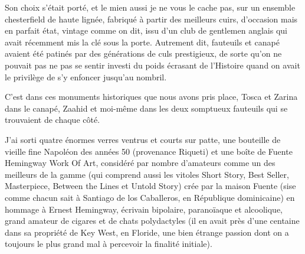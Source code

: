 Son choix s’était porté, et le mien aussi je ne vous le cache pas, sur un ensemble chesterfield de haute lignée, fabriqué à partir des meilleurs cuirs, d’occasion mais en parfait état, vintage comme on dit, issu d’un club de gentlemen anglais qui avait récemment mis la clé sous la porte. Autrement dit, fauteuils et canapé avaient été patinés par des générations de culs prestigieux, de sorte qu’on ne pouvait pas ne pas se sentir investi du poids écrasant de l’Histoire quand on avait le privilège de s’y enfoncer jusqu’au nombril.

C’est dans ces monuments historiques que nous avons pris place, Tosca et Zarina dans le canapé, Zaahid et moi-même dans les deux somptueux fauteuils qui se trouvaient de chaque côté.

\illusloflabel{}%
%
%
J’ai sorti quatre énormes verres ventrus et courts sur patte, une bouteille de vieille fine Napoléon des années 50 (provenance Riqueti) et une boîte de Fuente Hemingway Work Of Art, considéré par nombre d’amateurs comme un des meilleurs de la gamme (qui comprend aussi les vitoles Short Story, Best Seller, Masterpiece, Between the Lines et Untold Story) crée par la maison Fuente (sise comme chacun sait à Santiago de los Caballeros, en République dominicaine) en hommage à Ernest Hemingway, écrivain bipolaire, paranoïaque et alcoolique, grand amateur de cigares et de chats polydactyles (il en avait près d’une centaine dans sa propriété de Key West, en Floride, une bien étrange passion dont on a toujours le plus grand mal à percevoir la finalité initiale).

